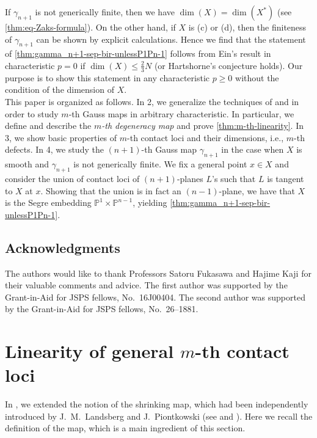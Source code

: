\documentclass[a4paper,12pt]{amsart}
\theoremstyle{plain}
\theoremstyle{definition}
\begin{document}
If $\gamma_{n+1}$ is not generically finite, then we have $\dim(X) = \dim(X^*)$ (see \autoref{thm:eq-Zaks-formula}).
On the other hand, if $X$ is (c) or (d), then the finiteness of $\gamma_{n+1}$ can be shown by explicit calculations.
Hence 
we find that the statement of \autoref{thm:gamma_n+1-sep-bir-unlessP1Pn-1}
follows from Ein's result in characteristic $p = 0$ if $\dim(X) {\leqslant} \frac{2}{3}N$ (or Hartshorne's conjecture holds).
Our purpose is to show this statement in any characteristic $p {\geqslant} 0$
without the condition of the dimension of $X$.
\\

This paper is organized as follows.
In \textsection{}2, we generalize the techniques of 
\cite{expshr} and \cite{FI} in order to study $m$-th Gauss maps in arbitrary characteristic.
In particular, we define and describe the \emph{$m$-th degeneracy map}
and prove \autoref{thm:m-th-linearity}.
In \textsection{}3, we show basic properties of $m$-th contact loci and their dimensions, i.e., $m$-th defects.
In \textsection{}4, we study the $(n+1)$-th Gauss map $\gamma_{n+1}$
in the case when $X$ is smooth and $\gamma_{n+1}$ is not generically finite. We fix a general point $x \in X$ and consider the union of contact loci of $(n+1)$-planes $L$'s such that $L$ is tangent to $X$ at $x$.
Showing that the union is in fact an $(n-1)$-plane,
we have that $X$ is the Segre embedding ${\mathbb{P}}^1 \times {\mathbb{P}}^{n-1}$,
yielding
\autoref{thm:gamma_n+1-sep-bir-unlessP1Pn-1}.

\subsection*{Acknowledgments}
The authors would like to thank
Professors Satoru Fukasawa and Hajime Kaji for their valuable comments and advice.
The first author was supported by the Grant-in-Aid for JSPS fellows, No.\ 16J00404.
The second author was supported by the Grant-in-Aid for JSPS fellows, No.\ 26--1881.

\section{Linearity of general $m$-th contact loci}

In \cite[Definition 2.1]{FI},
we extended the notion
of the shrinking map, which had been
independently introduced by
J.~M.~Landsberg and J.~Piontkowski
(see \cite[2.4.7]{FP} and \cite[Theorem~3.4.8]{IL}).
Here we recall the definition of the map,
which is a main ingredient of this section.
\end{document}
